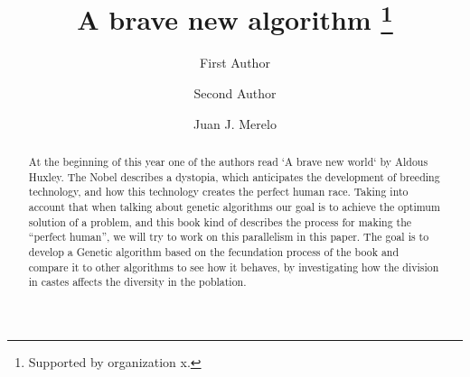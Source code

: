 \documentclass[runningheads]{llncs}
\begin{document}
%
\title{A brave new algorithm \thanks{Supported by organization x.}}
%
%
\author{First Author \and
Second Author \and
Juan J. Merelo}
%
%
%
\maketitle              %
%
\begin{abstract}

At the beginning of this year one of the authors read `A brave new
world` by Aldous Huxley.  The Nobel describes a dystopia, which
anticipates the development of breeding technology, and how this
technology creates the perfect human race. Taking into account that
when talking about genetic algorithms our goal is to achieve the
optimum solution of a problem, and this book kind of describes the
process for making the “perfect human”, we will try to work on this
parallelism in this paper. The goal is to develop a Genetic algorithm
based on the fecundation process of the book and compare it to other
algorithms to see how it behaves, by investigating how the division in
castes affects the diversity in the poblation.

\end{abstract}
%
%
%

% 








\end{document}
